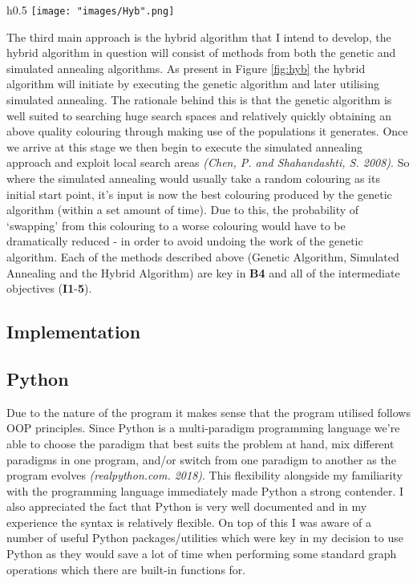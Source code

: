 \documentclass[12pt,a4paper]{article}
\begin{document}
\begin{wrapfigure}{h}{0.5\textwidth}
\texttt{[image: "images/Hyb".png]}
\caption{A data flow diagram for a hybrid algorithm involving a Genetic Algorithm and Simulated Annealing \textit{(Chen, P. and Shahandashti, S. 2008)}.}
\label{fig:hyb}
\end{wrapfigure}
\par The third main approach is the hybrid algorithm that I intend to develop, the hybrid algorithm in question will consist of methods from both the genetic and simulated annealing algorithms. As present in Figure \ref{fig:hyb} the hybrid algorithm will initiate by executing the genetic algorithm and later utilising simulated annealing. The rationale behind this is that the genetic algorithm is well suited to searching huge search spaces and relatively quickly obtaining an above quality colouring through making use of the populations it generates. Once we arrive at this stage we then begin to execute the simulated annealing approach and exploit local search areas \textit{(Chen, P. and Shahandashti, S. 2008)}. So where the simulated annealing would usually take a random colouring as its initial start point, it's input is now the best colouring produced by the genetic algorithm (within a set amount of time). Due to this, the probability of `swapping' from this colouring to a worse colouring would have to be dramatically reduced - in order to avoid undoing the work of the genetic algorithm. Each of the methods described above (Genetic Algorithm, Simulated Annealing and the Hybrid Algorithm) are key in \textbf{B4} and all of the intermediate objectives  (\textbf{I1}-\textbf{5}).
\subsection*{Implementation}
\subsection*{Python}
\noindent
Due to the nature of the program it makes sense that the program utilised follows OOP principles. Since Python is a multi-paradigm programming language we're able to choose the paradigm that best suits the problem at hand, mix different paradigms in one program, and/or switch from one paradigm to another as the program evolves \textit{(realpython.com. 2018)}. This flexibility alongside my familiarity with the programming language immediately made Python a strong contender. I also appreciated the fact that Python is very well documented and in my experience the syntax is relatively flexible. On top of this I was aware of a number of useful Python packages/utilities which were key in my decision to use Python as they would save a lot of time when performing some standard graph operations which there are built-in functions for.
\end{document}

